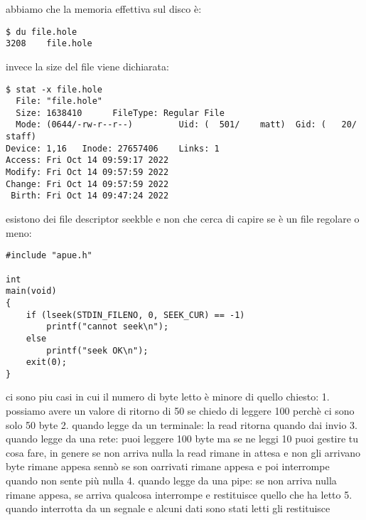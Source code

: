 abbiamo che la memoria effettiva sul disco è:

\begin{lstlisting}
$ du file.hole
3208	file.hole
\end{lstlisting}

invece la size del file viene dichiarata:

\begin{lstlisting}
$ stat -x file.hole 
  File: "file.hole"
  Size: 1638410      FileType: Regular File
  Mode: (0644/-rw-r--r--)         Uid: (  501/    matt)  Gid: (   20/   staff)
Device: 1,16   Inode: 27657406    Links: 1
Access: Fri Oct 14 09:59:17 2022
Modify: Fri Oct 14 09:57:59 2022
Change: Fri Oct 14 09:57:59 2022
 Birth: Fri Oct 14 09:47:24 2022
\end{lstlisting}




esistono dei file descriptor seekble e non che cerca di capire se è un file regolare o meno:

\begin{lstlisting}
#include "apue.h"

int
main(void)
{
	if (lseek(STDIN_FILENO, 0, SEEK_CUR) == -1)
		printf("cannot seek\n");
	else
		printf("seek OK\n");
	exit(0);
}
\end{lstlisting}




ci sono piu casi in cui il numero di byte letto è minore di quello chiesto:
1. possiamo avere un valore di ritorno di 50 se chiedo di leggere 100 perchè ci sono solo 50 byte
2. quando legge da un terminale: la read ritorna quando dai invio
3. quando legge da una rete: puoi leggere 100 byte ma se ne leggi 10 puoi gestire tu cosa fare, in genere se non arriva nulla la read rimane in attesa e non gli arrivano byte rimane appesa sennò se son oarrivati rimane appesa e poi interrompe quando non sente più nulla
4. quando legge da una pipe: se non arriva nulla rimane appesa, se arriva qualcosa interrompe e restituisce quello che ha letto
5. quando interrotta da un segnale e alcuni dati sono stati letti gli restituisce
